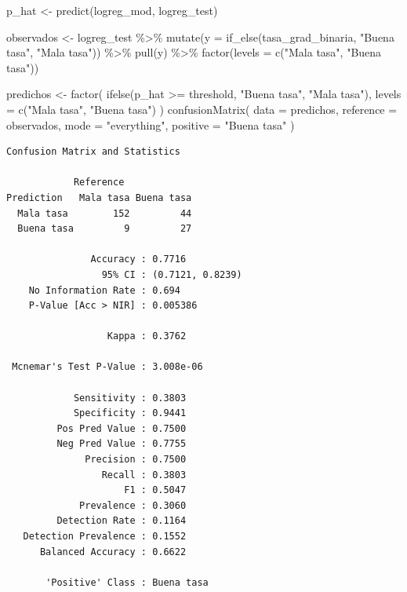 \documentclass[
  letterpaper,
  DIV=11,
  numbers=noendperiod]{scrartcl}
\newenvironment{Shaded}{\begin{snugshade}}{\end{snugshade}}
\newcommand{\AttributeTok}[1]{\textcolor[rgb]{0.40,0.45,0.13}{#1}}
\newcommand{\FunctionTok}[1]{\textcolor[rgb]{0.28,0.35,0.67}{#1}}
\newcommand{\NormalTok}[1]{\textcolor[rgb]{0.00,0.23,0.31}{#1}}
\newcommand{\OtherTok}[1]{\textcolor[rgb]{0.00,0.23,0.31}{#1}}
\newcommand{\SpecialCharTok}[1]{\textcolor[rgb]{0.37,0.37,0.37}{#1}}
\newcommand{\StringTok}[1]{\textcolor[rgb]{0.13,0.47,0.30}{#1}}
\begin{document}
\begin{Shaded}
\begin{Highlighting}[]
\NormalTok{p\_hat }\OtherTok{\textless{}{-}} \FunctionTok{predict}\NormalTok{(logreg\_mod, logreg\_test)}

\NormalTok{observados }\OtherTok{\textless{}{-}}\NormalTok{ logreg\_test }\SpecialCharTok{\%\textgreater{}\%} 
  \FunctionTok{mutate}\NormalTok{(}\AttributeTok{y =} \FunctionTok{if\_else}\NormalTok{(tasa\_grad\_binaria, }\StringTok{"Buena tasa"}\NormalTok{, }\StringTok{"Mala tasa"}\NormalTok{)) }\SpecialCharTok{\%\textgreater{}\%} 
  \FunctionTok{pull}\NormalTok{(y) }\SpecialCharTok{\%\textgreater{}\%} 
  \FunctionTok{factor}\NormalTok{(}\AttributeTok{levels =} \FunctionTok{c}\NormalTok{(}\StringTok{"Mala tasa"}\NormalTok{, }\StringTok{"Buena tasa"}\NormalTok{))}

\NormalTok{predichos }\OtherTok{\textless{}{-}} \FunctionTok{factor}\NormalTok{(}
  \FunctionTok{ifelse}\NormalTok{(p\_hat }\SpecialCharTok{\textgreater{}=}\NormalTok{ threshold, }\StringTok{"Buena tasa"}\NormalTok{, }\StringTok{"Mala tasa"}\NormalTok{), }
  \AttributeTok{levels =} \FunctionTok{c}\NormalTok{(}\StringTok{"Mala tasa"}\NormalTok{, }\StringTok{"Buena tasa"}\NormalTok{)}
\NormalTok{)}
\FunctionTok{confusionMatrix}\NormalTok{(}
  \AttributeTok{data =}\NormalTok{ predichos, }
  \AttributeTok{reference =}\NormalTok{ observados, }
  \AttributeTok{mode =} \StringTok{"everything"}\NormalTok{,}
  \AttributeTok{positive =} \StringTok{"Buena tasa"}
\NormalTok{)}
\end{Highlighting}
\end{Shaded}

\begin{verbatim}
Confusion Matrix and Statistics

            Reference
Prediction   Mala tasa Buena tasa
  Mala tasa        152         44
  Buena tasa         9         27
                                          
               Accuracy : 0.7716          
                 95% CI : (0.7121, 0.8239)
    No Information Rate : 0.694           
    P-Value [Acc > NIR] : 0.005386        
                                          
                  Kappa : 0.3762          
                                          
 Mcnemar's Test P-Value : 3.008e-06       
                                          
            Sensitivity : 0.3803          
            Specificity : 0.9441          
         Pos Pred Value : 0.7500          
         Neg Pred Value : 0.7755          
              Precision : 0.7500          
                 Recall : 0.3803          
                     F1 : 0.5047          
             Prevalence : 0.3060          
         Detection Rate : 0.1164          
   Detection Prevalence : 0.1552          
      Balanced Accuracy : 0.6622          
                                          
       'Positive' Class : Buena tasa      
                                          
\end{verbatim}
\end{document}
